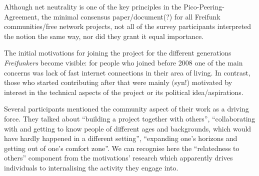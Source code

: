 \begin{comment}
---

### Mir ist Netzneutralität wichtig

* 6 ja
* 1 ja (sesibilität dafür im Freifunk kontext ist nicht unbedingt gegeben)
* 4 ja (aber sieht FF nicht als Kampf für Netzneutralität)
* 1 ja (aber die um jeden preis zu fordern ist schwierig und nicht sehr schlau)
* 1 ja (Pico-Peering-Agreement ist total wichtig!)
* 1 ja (man kanns zumindest versuchen :))

---

### Ich mach das mit Freifunk beruflich: krieg Geld für Knoten einrichten, Wartung, ...

* 9 nein
* 1 joa, kann man als Beruf sehen^^ steckt ziemlich viel Zeit und Energie rein und hat schonmal im Kontext Geld für die eigene Arbeit bekommen
* 1 macht jetzt was mit WiFi und Mesh beruflich (nicht mit Freifunk); eher Konsequenz aus Freifunk als Motivation dafür
* 1 macht beruflich was mit wlan installationen, versuchts aber von ff zu trennen

---

### Ich mach/will machen was auf dem Gebiet beruflich und das ist die Gelegenheit, meine Fähigkeiten aufzupollieren/Kontakte knüpfen/für Arbeitgeber_innen sichtbar werden

* 2 nein (eher: war der Bereich, wo ich meine bereits vorhandenen Kenntnisse anwenden konnte)
* 6 nein
* 1 nein (aber wenn was mit netzwerk machen wollen würde, würde die ff community schon als Kommunikations-/Kontaktplattform sehen)
* 3 nein (passiert sicher, ist aber keine motivation sich mit dem Projekt zu beschäftigen)
* 2 nein (schreibt man schon in den Lebenslauf aber keine Motivation um dahinzugehen)
\end{comment}

Although net neutrality is one of the key principles in the Pico-Peering-Agreement, the minimal consensus paper/document(?) for all Freifunk communities/free network projects, not all of the survey participants interpreted the notion the same way, nor did they grant it equal importance.

The initial motivations for joining the project for the different generations \textit{Freifunkers} become visible:
for people who joined before 2008 one of the main concerns was lack of fast internet connections in their area of living.
In contrast, those who started contributing after that were mainly (syn!) motivated by interest in the technical aspects of the project or its political idea/aspirations.

Several participants mentioned the community aspect of their work as a driving force.
They talked about ``building a project together with others'', ``collaborating with and getting to know people of different ages and backgrounds, which would have hardly happened in a different setting'', ``expanding one's horizons and getting out of one's comfort zone''.
We can recognise here the ``relatedness to others'' component from the motivations' research which apparently drives individuals to internalising the activity they engage into.

